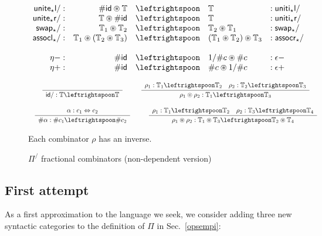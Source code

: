 \documentclass[a4paper,USenglish]{lipics-v2016-utf8x}
\newcommand{\hash}{\#}
\newcommand{\isotwo}{\Leftrightarrow}
\newcommand{\order}[1]{\hash #1}
\newcommand{\iorder}[1]{1/\hash #1}
\newcommand{\Rule}[4]{
\makebox{{\rm #1}
$\displaystyle
\frac{\begin{array}{l}#2\\\end{array}}
{\begin{array}{l}#3\\\end{array}}$
 #4}}
\newcommand{\jdg}[3]{{#1} #3}
\newcommand{\unitetl}{\mathsf{{unite_{\star}l}}}
\newcommand{\unititl}{\mathsf{{uniti_{\star}l}}}
\newcommand{\unitetr}{\mathsf{{unite_{\star}r}}}
\newcommand{\unititr}{\mathsf{{uniti_{\star}r}}}
\newcommand{\swapt}{\mathsf{{swap_{\star}}}}
\newcommand{\assoclt}{\mathsf{{assocl_{\star}}}}
\newcommand{\assocrt}{\mathsf{{assocr_{\star}}}}
\newcommand{\idiso}{\mathsf{{id}}}
\begin{document}
\begin{figure}[t]
\[\begin{array}{rrcll}
\unitetl/ :&  \order{\idiso} \circledast \mathbb{T} & \leftrightspoon & \mathbb{T} &: \unititl/ \\
\unitetr/ :&  \mathbb{T} \circledast \order{\idiso} & \leftrightspoon & \mathbb{T} &: \unititr/ \\
\swapt/ :&  \mathbb{T}_1 \circledast \mathbb{T}_2 & \leftrightspoon & \mathbb{T}_2 \circledast \mathbb{T}_1 &: \swapt/ \\
\assoclt/ :&  \mathbb{T}_1 \circledast (\mathbb{T}_2 \circledast \mathbb{T}_3) & \leftrightspoon & (\mathbb{T}_1 \circledast \mathbb{T}_2) \circledast \mathbb{T}_3
  &: \assocrt/ \\
\\
\eta- :& \order{\idiso} & \leftrightspoon & \iorder{c} \circledast \order{c} &: \epsilon- \\
\eta+ :& \order{\idiso} & \leftrightspoon & \order{c} \circledast \iorder{c} &: \epsilon+ \\
\end{array}\]

\[\begin{array}{c}
\Rule{}
{}
{\jdg{}{}{\idiso/ : \mathbb{T} \leftrightspoon \mathbb{T}}}
{}
\qquad
\Rule{}
{\jdg{}{}{\rho_1 : \mathbb{T}_1 \leftrightspoon \mathbb{T}_2} \quad \rho_2 : \mathbb{T}_2 \leftrightspoon \mathbb{T}_3}
{\jdg{}{}{\rho_1 \circledcirc \rho_2 : \mathbb{T}_1 \leftrightspoon \mathbb{T}_3}}
{}
\\
\\
\Rule{}
{\jdg{}{}{\alpha : c_1 \isotwo c_2}}
{\jdg{}{}{\order{\alpha} : \order{c_1}  \leftrightspoon \order{c_2}}}
{}
\qquad
\Rule{}
{\jdg{}{}{\rho_1 : \mathbb{T}_1 \leftrightspoon \mathbb{T}_2} \quad \rho_2 : \mathbb{T}_3 \leftrightspoon \mathbb{T}_4}
{\jdg{}{}{\rho_1 \circledast \rho_2 : \mathbb{T}_1 \circledast \mathbb{T}_3 \leftrightspoon \mathbb{T}_2 \circledast \mathbb{T}_4}}
{}
\end{array}\]

Each combinator $\rho$ has an inverse.
\caption{$\Pi^/$ fractional combinators (non-dependent version)}
\label{pifrac:comb}
\end{figure}

\subsection{First attempt}

As a first approximation to the language we seek, we consider adding three new
syntactic categories to the definition of $\Pi$ in Sec.~\ref{opsempi}:
\end{document}
